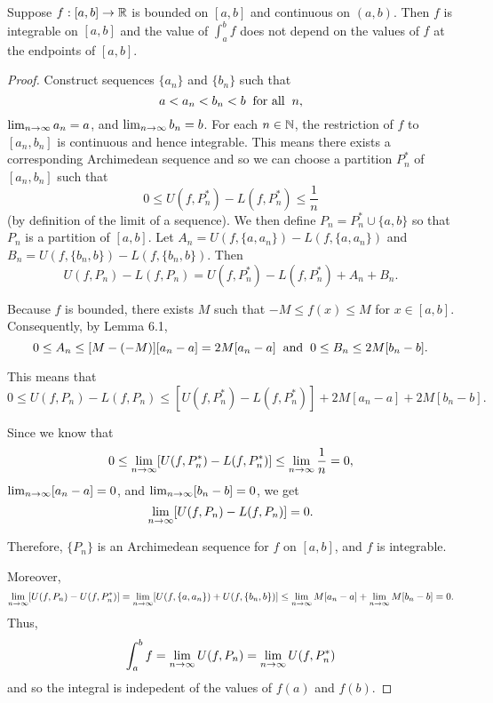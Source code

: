 \documentclass[letterpaper, twoside, 12pt]{book}
\begin{document}
\begin{theorem}[6.19]
  Suppose \(f:[a,b]\to\mathbb R\) is bounded on \([a,b]\) and continuous on
  \((a,b)\). Then \(f\) is integrable on \([a,b]\) and the value of
  \(\int_a^b f\) does not depend on the values of \(f\) at the endpoints
  of \([a,b]\).
\end{theorem}

\begin{proof}
    Construct sequences \(\{a_n\}\) and \(\{b_n\}\) such that 
    \[ a < a_n < b_n < b \hspace{2mm} \text{for all} \hspace{2mm} n ,\]
    \(\lim_{n \to \infty} a_n = a\), and \(\lim_{n \to \infty} b_n = b\). For each \(n \in \mathbb N\),
    the restriction of \(f\) to \([a_n, b_n]\) is continuous and hence
    integrable. This means there exists a corresponding Archimedean
    sequence and so we can choose a partition \(P_n^*\) of \([a_n, b_n]\)
    such that 
    \[ 0 \leq U(f, P_n^*) - L(f, P_n^*) \leq \frac{1}{n} \]
    (by definition of the limit of a sequence). We then define
    \(P_n = P_n^* \cup \{a, b\}\) so that \(P_n\) is a partition of 
    \([a,b]\). Let \(A_n = U(f, \{a, a_n\}) - L(f, \{a, a_n\})\)
    and \(B_n = U(f, \{b_n, b\}) - L(f, \{b_n, b\})\). Then
    \[ U(f, P_n) - L(f, P_n) = U(f, P_n^*) - L(f, P_n^*) + A_n + B_n .\]

    Because \(f\) is bounded, there exists \(M\) such that
    \(-M \leq f(x) \leq M\) for \(x \in [a,b]\). Consequently, by Lemma 6.1,
    \[ 0 \leq A_n \leq [M - (-M)][a_n - a] = 2M[a_n - a] \hspace{2mm} \text{and} \hspace{2mm} 0 \leq B_n \leq 2M[b_n - b] .\]
    
    This means that 
    \[ 0 \leq U(f, P_n) - L(f, P_n) \leq [U(f, P_n^*) - L(f, P_n^*)] + 2M[a_n - a] + 2M[b_n - b] .\]

    Since we know that 
    \[0 \leq \lim_{n \to \infty} [U(f, P_n^*) - L(f, P_n^*)] \leq \lim_{n \to \infty} \frac{1}{n} = 0 ,\]
    \(\lim_{n \to \infty} [a_n - a] = 0\), and \(\lim_{n \to \infty} [b_n - b] = 0\), we get
    \[ \lim_{n \to \infty} [U(f, P_n) - L(f, P_n)] = 0 .\]

    Therefore, \(\{P_n\}\) is an Archimedean sequence for \(f\) on \([a,b]\),
    and \(f\) is integrable.

    
    Moreover, 
    \[ \lim_{n \to \infty} [ U(f, P_n) - U(f, P_n^*) ] = \lim_{n \to \infty} [ U(f, \{a, a_n\}) +  U(f, \{b_n, b\}) ] \leq \lim_{n \to \infty} M[a_n - a] + \lim_{n \to \infty} M[b_n - b] = 0 .\]
    Thus,
    \[ \int_a^b f = \lim_{n \to \infty} U(f, P_n) = \lim_{n \to \infty} U(f, P_n^*) \]
    and so the integral is indepedent of the values of \(f(a)\) and \(f(b)\).

\end{proof}
\end{document}
